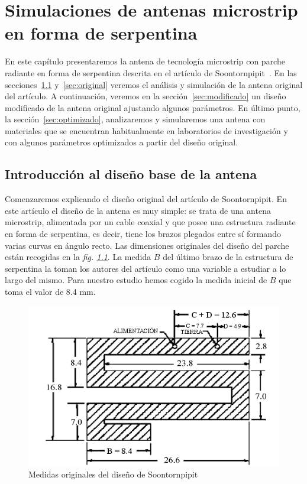 \chapter{\textbf{Simulaciones de antenas microstrip en forma de serpentina}}\label{ch:simulaciones}

En este capítulo presentaremos la antena de tecnología microstrip con parche radiante en forma de serpentina descrita en el artículo de Soontornpipit~\cite{soont}. En las secciones~\ref{sec:base} y~\ref{sec:original} veremos el análisis y simulación de la antena original del artículo. A continuación, veremos en la sección~\ref{sec:modificado} un diseño modificado de la antena original ajustando algunos parámetros. En último punto, la sección~\ref{sec:optimizado}, analizaremos y simularemos una antena con materiales que se encuentran habitualmente en laboratorios de investigación y con algunos parámetros optimizados a partir del diseño original.


\section{Introducción al diseño base de la antena}\label{sec:base}

Comenzaremos explicando el diseño original del artículo de Soontornpipit. En este artículo el diseño de la antena es muy simple: se trata de una antena microstrip, alimentada por un cable coaxial y que posee una estructura radiante en forma de serpentina, es decir, tiene los brazos plegados entre sí formando varias curvas en ángulo recto. Las dimensiones originales del diseño del parche están recogidas en la \textit{fig. \ref{fig:fig5.1}}. La medida $B$ del último brazo de la estructura de serpentina la toman los autores del artículo como una variable a estudiar a lo largo del mismo. Para nuestro estudio hemos cogido la medida inicial de $B$ que toma el valor de 8.4 mm.

\begin{figure}[!htb]
    \centering
    \includegraphics[scale=0.55]{./Simulaciones/original_design2}
    \caption{Medidas originales del diseño de Soontornpipit \cite{serpentina}}
    \label{fig:fig5.1}
\end{figure}

